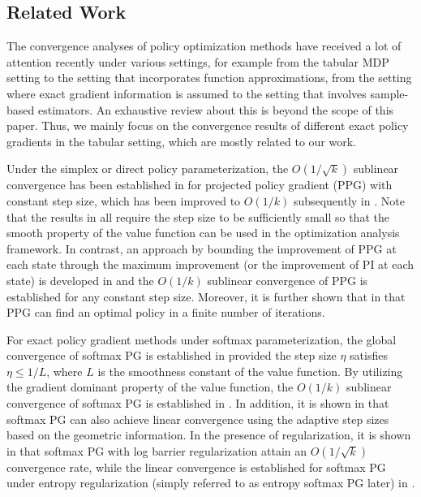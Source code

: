 \subsection{Related Work}
The convergence analyses of policy optimization methods have received a lot of attention recently under various settings, for example from the tabular MDP setting to the setting that incorporates function approximations, from the setting where exact gradient information is assumed to the setting that involves sample-based estimators. An exhaustive review about this is beyond the scope of this paper. Thus, we mainly focus on the convergence results of  different exact policy gradients in the tabular setting, which are mostly related to our work.

Under the simplex or direct policy parameterization, the $O(1/\sqrt{k})$ sublinear convergence has been established in \cite{Agarwal_Kakade_Lee_Mahajan_2019, bhabdari2024or} for projected policy gradient (PPG) with constant step size, which has been improved to $O(1/k)$ subsequently in \cite{Xiao_2022, Zhang_Koppel_Bedi_Szepesvari_Wang_2020}. Note that the results in \cite{Agarwal_Kakade_Lee_Mahajan_2019, bhabdari2024or,Xiao_2022, Zhang_Koppel_Bedi_Szepesvari_Wang_2020} all require the step size to be sufficiently small so that the smooth property of the value function can be used in the optimization analysis framework. In contrast, an approach by bounding the improvement of PPG at each state through the maximum improvement (or the improvement of PI at each state) is developed in \cite{ppgliu} and the $O(1/k)$ sublinear convergence of PPG is established for any constant step size. Moreover, it is further shown that in \cite{ppgliu} that PPG can find an optimal policy in a finite number of iterations.

For exact policy gradient methods under softmax parameterization, the global convergence of softmax PG is established in \cite{Agarwal_Kakade_Lee_Mahajan_2019} provided the step size $\eta$ satisfies $\eta\leq 1/L$, where $L$ is the smoothness constant of the value function. By utilizing the gradient dominant property of the value function, the $O(1/k)$ sublinear convergence of softmax PG is established in \cite{Mei_Xiao_Szepesvari_Schuurmans_2020}. In addition, it is shown in \cite{mei2021normalized} that  softmax PG can also achieve linear convergence using the adaptive step sizes based on the
geometric information.
In the presence of regularization, it is shown in \cite{Agarwal_Kakade_Lee_Mahajan_2019} that softmax PG with log barrier regularization attain an $O(1/\sqrt{k})$ convergence rate, while the linear convergence is established for softmax PG under entropy regularization (simply referred to as entropy softmax PG later) in \cite{Mei_Xiao_Szepesvari_Schuurmans_2020}. 

